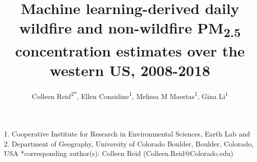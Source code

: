 \documentclass[english]{article}
\begin{document}

\title{Machine learning-derived daily wildfire and non-wildfire PM\textsubscript{2.5} concentration estimates over the western US, 2008-2018}

\author{Colleen Reid\textsuperscript{2{*}},
Ellen Considine\textsuperscript{1},
Melissa M Maestas\textsuperscript{1}, 
Gina Li\textsuperscript{1}}

\maketitle
\thispagestyle{fancy}

1. Cooperative Institute for Research in
Environmental Sciences, Earth Lab and %
2. Department of Geography, University of Colorado Boulder,
Boulder, Colorado, USA 
{*}corresponding author(s): Colleen Reid (Colleen.Reid@Colorado.edu)
\end{document}
